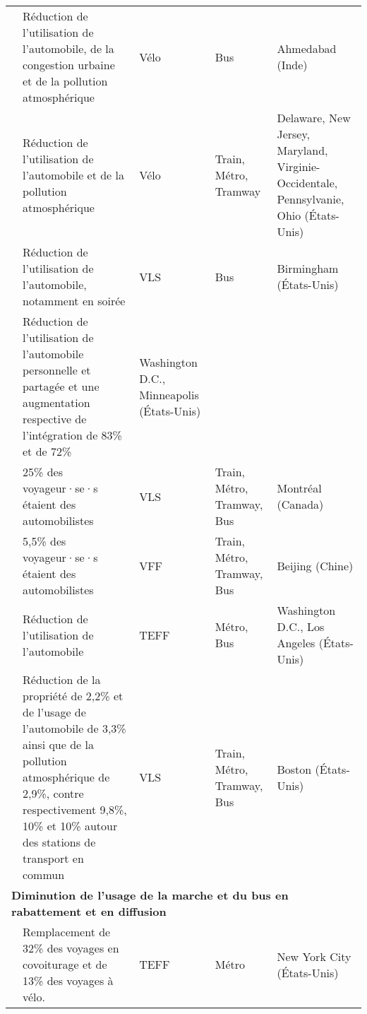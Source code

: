 \begin{longtable}{p{3cm}p{4cm}p{1.5cm}p{1.8cm}p{2.3cm}}
    \small{\textcite{balya_integration_2016}}\index{Balya, Manjurali|pagebf} & \small{Réduction de l'utilisation de l'automobile, de la congestion urbaine et de la pollution atmosphérique} & \small{Vélo} & \small{Bus} & \small{Ahmedabad (Inde)}\\
    \small{\textcite{bopp_examining_2015}}\index{Bopp, Melissa|pagebf} & \small{Réduction de l'utilisation de l'automobile et de la pollution atmosphérique} & \small{Vélo} & \small{Train, Métro, Tramway} & \small{Delaware, New Jersey, Maryland, Virginie-Occidentale, Pennsylvanie, Ohio (États-Unis)}\\
    \small{\textcite{glass_role_2020}}\index{Glass, Caroline|pagebf} & \small{Réduction de l'utilisation de l'automobile, notamment en soirée} & \small{VLS} & \small{Bus} & \small{Birmingham (États-Unis)}\\
    \small{\textcite{martin_evaluating_2014}}\index{Martin, Elliot W.|pagebf} & \small{Réduction de l'utilisation de l'automobile personnelle et partagée et une augmentation respective de l'intégration de 83\% et de 72\%} & \small{Washington D.C., Minneapolis (États-Unis)}\\
    \small{\textcite{bachand-marleau_much-anticipated_2011}}\index{Bachand-Marleau, Julie|pagebf} & \small{25\% des voyageur·se·s étaient des automobilistes} & \small{VLS} & \small{Train, Métro, Tramway, Bus} & \small{Montréal (Canada)}\\
    \small{\textcite{fan_how_2019}}\index{Fan, Aihua|pagebf} & \small{5,5\% des voyageur·se·s étaient des automobilistes} & \small{VFF} & \small{Train, Métro, Tramway, Bus} & \small{Beijing (Chine)}\\
    \small{\textcite{yan_evaluating_2023}}\index{Yan, Xiang|pagebf} & \small{Réduction de l'utilisation de l'automobile} & \small{TEFF} & \small{Métro, Bus} & \small{Washington D.C., Los Angeles (États-Unis)}\\
    \small{\textcite{basu_planning_2021}}\index{Basu, Rounaq|pagebf} & \small{Réduction de la propriété de 2,2\% et de l'usage de l'automobile de 3,3\% ainsi que de la pollution atmosphérique de 2,9\%, contre respectivement 9,8\%, 10\% et 10\% autour des stations de transport en commun} & \small{VLS} & \small{Train, Métro, Tramway, Bus} & \small{Boston (États-Unis)}\\
    \hline
\multicolumn{5}{l}{\textbf{Diminution de l'usage de la marche et du bus en \gls{rabattement} et en \gls{diffusion}}}\\
    \small{\textcite{lee_forecasting_2021}}\index{Lee, Mina|pagebf} & \small{Remplacement de 32\% des voyages en covoiturage et de 13\% des voyages à vélo.} & \small{TEFF} & \small{Métro} & \small{New York City (États-Unis)}\\

\end{longtable}
